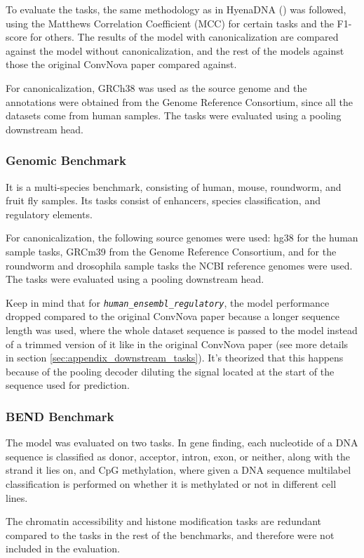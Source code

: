 \documentclass[   ]{article}
\let\oldtexttt\texttt
\renewcommand{\texttt}[1]{\oldtexttt{\itshape #1}}
\begin{document}
To evaluate the tasks, the same methodology as in HyenaDNA
(\citep{nguyenHyenaDNALongRangeGenomic2023}) was followed, using the
Matthews Correlation Coefficient (MCC) for certain tasks and the
F1-score for others. The results of the model with canonicalization are
compared against the model without canonicalization, and the rest of the
models against those the original ConvNova paper compared against.

For canonicalization, GRCh38 was used as the source genome and the
annotations were obtained from the Genome Reference Consortium, since all the datasets come from human samples. The tasks were evaluated using a pooling downstream head.

\subsubsection{Genomic Benchmark}
It is a multi-species benchmark, consisting of human, mouse,
roundworm, and fruit fly samples. Its tasks consist of enhancers,
species classification, and regulatory elements.

For canonicalization, the following source genomes were used: hg38 for
the human sample tasks, GRCm39 from the Genome Reference Consortium, and for the roundworm and drosophila sample
tasks the NCBI reference genomes were used. The tasks were evaluated using a pooling downstream head.

Keep in mind that for \texttt{human\_ensembl\_regulatory}, the model performance dropped compared to the original ConvNova paper because a longer sequence length was used, where the whole dataset sequence is passed to the model instead of a trimmed version of it like in the original ConvNova paper (see more details in section \ref{sec:appendix_downstream_tasks}). It's theorized that this happens because of the pooling decoder diluting the signal located at the start of the sequence used for prediction.

\subsubsection{BEND Benchmark}
The model was evaluated on two tasks. In gene finding, each nucleotide of a DNA sequence is classified as donor, acceptor, intron, exon, or neither, along with the strand it lies on, and CpG methylation, where given a DNA sequence multilabel classification is
performed on whether it is methylated or not in different cell lines.

The chromatin accessibility and histone modification tasks are redundant
compared to the tasks in the rest of the benchmarks, and therefore were
not included in the evaluation.
\end{document}
